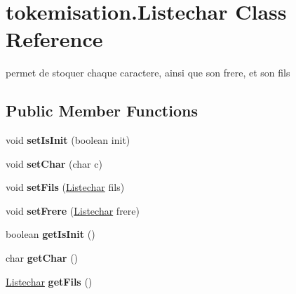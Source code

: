 \hypertarget{classtokemisation_1_1_listechar}{}\section{tokemisation.\+Listechar Class Reference}
\label{classtokemisation_1_1_listechar}


permet de stoquer chaque caractere, ainsi que son frere, et son fils  


\subsection*{Public Member Functions}
\begin{DoxyCompactItemize}
\item 
void {\bfseries set\+Is\+Init} (boolean init)\hypertarget{classtokemisation_1_1_listechar_a7bcc4b46efebbe8117f625685a6d95b8}{}\label{classtokemisation_1_1_listechar_a7bcc4b46efebbe8117f625685a6d95b8}

\item 
void {\bfseries set\+Char} (char c)\hypertarget{classtokemisation_1_1_listechar_ae9f093e05f4bb4ecb0204fd08d7bf9d3}{}\label{classtokemisation_1_1_listechar_ae9f093e05f4bb4ecb0204fd08d7bf9d3}

\item 
void {\bfseries set\+Fils} (\hyperlink{classtokemisation_1_1_listechar}{Listechar} fils)\hypertarget{classtokemisation_1_1_listechar_af6f52f861756f43b6e4241e2fbc09110}{}\label{classtokemisation_1_1_listechar_af6f52f861756f43b6e4241e2fbc09110}

\item 
void {\bfseries set\+Frere} (\hyperlink{classtokemisation_1_1_listechar}{Listechar} frere)\hypertarget{classtokemisation_1_1_listechar_ae98806e1c440fc4e77641996ac01e666}{}\label{classtokemisation_1_1_listechar_ae98806e1c440fc4e77641996ac01e666}

\item 
boolean {\bfseries get\+Is\+Init} ()\hypertarget{classtokemisation_1_1_listechar_aaf529076c50565da487289b1c4fe753a}{}\label{classtokemisation_1_1_listechar_aaf529076c50565da487289b1c4fe753a}

\item 
char {\bfseries get\+Char} ()\hypertarget{classtokemisation_1_1_listechar_aa819fd8ead7a8e2d905561b3cd366a38}{}\label{classtokemisation_1_1_listechar_aa819fd8ead7a8e2d905561b3cd366a38}

\item 
\hyperlink{classtokemisation_1_1_listechar}{Listechar} {\bfseries get\+Fils} ()\hypertarget{classtokemisation_1_1_listechar_a143c64ece7dcb6acf0bf0e2e5d6b5809}{}\label{classtokemisation_1_1_listechar_a143c64ece7dcb6acf0bf0e2e5d6b5809}


\end{DoxyCompactItemize}
